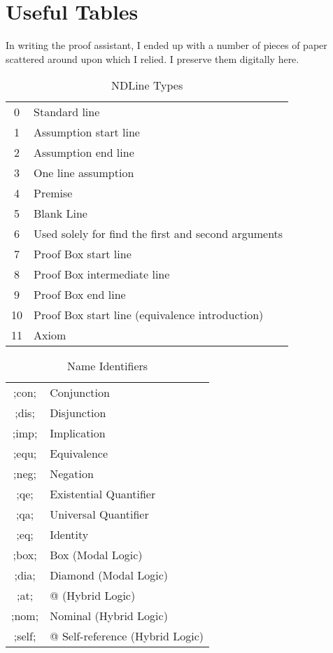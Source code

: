 \documentclass[a4paper]{article}
\begin{document}
\appendix
\section{Useful Tables}
In writing the proof assistant, I ended up with a number of pieces of paper scattered around upon which I relied. I preserve them digitally here.

\begin{table}[htbp]
	\centering
		\begin{tabular}{c l}
			0 & Standard line\\
			1 & Assumption start line\\
			2 & Assumption end line\\
			3 & One line assumption\\
			4 & Premise\\
			5 & Blank Line\\
			6 & Used solely for find the first and second arguments\\
			7 & Proof Box start line\\
			8 & Proof Box intermediate line\\
			9 & Proof Box end line\\
			10 & Proof Box start line (equivalence introduction)\\
			11 & Axiom
		\end{tabular}
	\caption{NDLine Types}
	\label{tab:NDLineTypes}
\end{table}

\begin{table}[htbp]
	\centering
		\begin{tabular}{c l}
			;con; & Conjunction\\
			;dis; & Disjunction\\
			;imp; & Implication\\
			;equ; & Equivalence\\
			;neg; & Negation\\
			;qe; & Existential Quantifier\\
			;qa; & Universal Quantifier\\
			;eq; & Identity\\
			;box; & Box (Modal Logic)\\
			;dia; & Diamond (Modal Logic)\\
			;at; & @ (Hybrid Logic)\\
			;nom; & Nominal (Hybrid Logic)\\
			;self; & @ Self-reference (Hybrid Logic)
		\end{tabular}
	\caption{Name Identifiers}
	\label{tab:NameIdentifiers}
\end{table}
\end{document}
